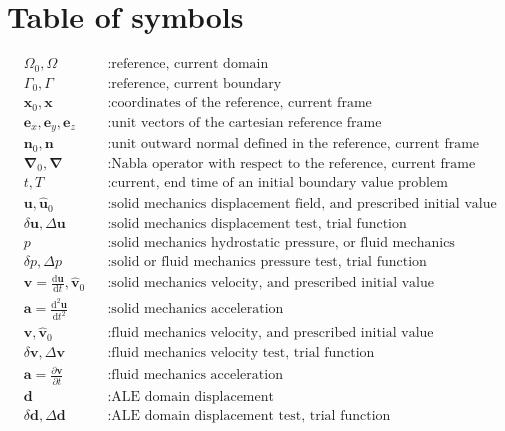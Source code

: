 \documentclass[a4paper,12pt]{report}
\newcommand{\bs}[1]{\boldsymbol{#1}}
\newcommand{\Om}{\mathit{\Omega}}
\newcommand{\Gm}{\mathit{\Gamma}}
\begin{document}
\clearpage

\section{Table of symbols}
\begin{equation}
\nonumber
\begin{aligned}
&\Om_0,\Om &&: \text{reference, current domain} \\
&\Gm_0,\Gm &&: \text{reference, current boundary} \\
&\bs{x}_0, \bs{x} &&: \text{coordinates of the reference, current frame} \\
&\bs{e}_x, \bs{e}_y, \bs{e}_z &&: \text{unit vectors of the cartesian reference frame} \\
&\bs{n}_0, \bs{n} &&: \text{unit outward normal defined in the reference, current frame} \\
&\bs{\nabla}_{0},\bs{\nabla} &&: \text{Nabla operator with respect to the reference, current frame} \\
&t, T &&: \text{current, end time of an initial boundary value problem} \\
&\bs{u}, \hat{\bs{u}}_{0} &&: \text{solid mechanics displacement field, and prescribed initial value} \\
&\delta\bs{u}, \Delta\bs{u} &&: \text{solid mechanics displacement test, trial function} \\
& p &&: \text{solid mechanics hydrostatic pressure, or fluid mechanics pressure} \\
& \delta p, \Delta p &&: \text{solid or fluid mechanics pressure test, trial function} \\
&\bs{v}=\frac{\mathrm{d}\bs{u}}{\mathrm{d}t}, \hat{\bs{v}}_{0} &&: \text{solid mechanics velocity, and prescribed initial value} \\
&\bs{a}=\frac{\mathrm{d}^2\bs{u}}{\mathrm{d}t^2} &&: \text{solid mechanics acceleration} \\
&\bs{v}, \hat{\bs{v}}_{0} &&: \text{fluid mechanics velocity, and prescribed initial value} \\
&\delta\bs{v}, \Delta\bs{v} &&: \text{fluid mechanics velocity test, trial function} \\
&\bs{a}=\frac{\partial\bs{v}}{\partial t} &&: \text{fluid mechanics acceleration} \\
&\bs{d} &&: \text{ALE domain displacement} \\
&\delta\bs{d}, \Delta\bs{d} &&: \text{ALE domain displacement test, trial function} \\

\end{aligned}
\end{equation}
\end{document}
